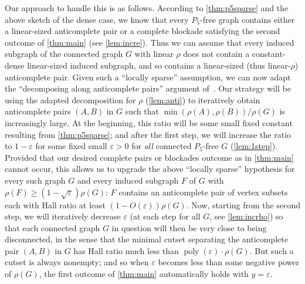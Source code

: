 \documentclass[11pt,reqno]{amsart}
\newcommand{\eps}{\varepsilon}
\begin{document}
	Our approach to handle this is as follows. According to \cref{thm:p5sparse} and the above sketch of the dense case, we know that every $P_5$-free graph contains either a linear-sized anticomplete pair or a complete blockade satisfying the second outcome of \cref{thm:main} (see \cref{lem:incre}).
	Thus we can assume that every induced subgraph of the connected graph $G$ with linear $\rho$ does not contain a constant-dense linear-sized induced subgraph, and so contains a linear-sized (thus linear-$\rho$) anticomplete pair.
	Given such a ``locally sparse'' assumption, we can now adapt the ``decomposing along anticomplete pairs'' argument of~\cite[Section 4]{2024p5}.
	Our strategy will be using the adapted decomposition for $\rho$ (\cref{lem:anti}) to iteratively obtain anticomplete pairs $(A,B)$ in $G$ such that $\min(\rho(A),\rho(B))/\rho(G)$ is increasingly large.
	At the beginning, this ratio will be some small fixed constant resulting from \cref{thm:p5sparse};
	and after the first step, we will increase the ratio to $1-\eps$ for some fixed small $\eps>0$ for {\em all} connected $P_5$-free $G$ (\cref{lem:1step}).
	Provided that our desired complete pairs or blockades outcome as in \cref{thm:main} cannot occur, this allows us to upgrade the above ``locally sparse'' hypothesis for every such graph $G$ and every induced subgraph $F$ of $G$ with $\rho(F)\ge (1-\sqrt{\eps})\rho(G)$: $F$ contains an anticomplete pair of vertex subsets each with Hall ratio at least $(1-O(\eps))\rho(G)$.
	Now, starting from the second step, we will iteratively decrease $\eps$ (at each step for all $G$, see \cref{lem:incrho}) so that each connected graph $G$ in question will then be very close to being disconnected, in the sense that the minimal cutset separating the anticomplete pair $(A,B)$ in $G$ has Hall ratio much less than $\operatorname{poly}(\eps)\cdot\rho(G)$.
	But such a cutset is always nonempty; and so when $\eps$ becomes less than some negative power of $\rho(G)$, the first outcome of \cref{thm:main} automatically holds with $y=\eps$.
	
\end{document}
